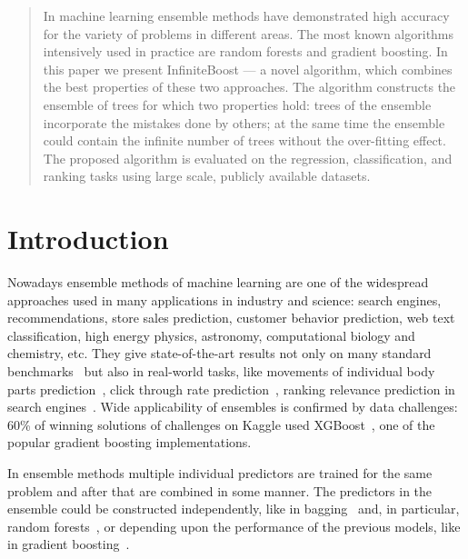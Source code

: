 \begin{abstract}
    In machine learning ensemble methods have demonstrated high accuracy for the variety of problems in different areas.
    The most known algorithms intensively used in practice are random forests and gradient boosting.
    In this paper we present InfiniteBoost --- a novel algorithm, which combines the best properties of these two approaches. 
    The algorithm constructs the ensemble of trees for which two properties hold: trees of the ensemble incorporate the mistakes done by others; at the same time the ensemble could contain the infinite number of trees without the over-fitting effect.
    The proposed algorithm is evaluated on the regression, classification, and ranking tasks using large scale, publicly available datasets.
\end{abstract}

\section{Introduction}

Nowadays ensemble methods of machine learning are one of the widespread approaches used in many applications in industry and science:
search engines, recommendations, store sales prediction, customer behavior prediction, web text classification, high energy physics, astronomy, computational biology and chemistry, etc.
They give state-of-the-art results not only on many standard benchmarks~\cite{key-benchmarks,key-benchmarks-forest} but also in real-world tasks, like movements of individual body parts prediction~\cite{key-kinect}, click through rate prediction~\cite{key-facebook}, ranking relevance prediction in search engines~\cite{key-yahoo}. 
Wide applicability of ensembles is confirmed by data challenges: 60\% of winning solutions of challenges on Kaggle used XGBoost~\cite{key-xgboost}, one of the popular gradient boosting implementations. 

In ensemble methods multiple individual predictors are trained for the same problem and after that are combined in some manner.
The predictors in the ensemble could be constructed independently, like in bagging~\cite{key-bagging} and, in particular, random forests~\cite{key-random-forest}, or depending upon the performance of the previous models, like in gradient boosting~\cite{key-gb}.

